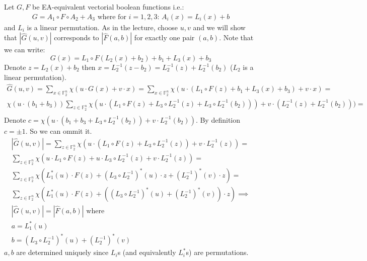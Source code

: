 \documentclass[12pt, a4paper]{article}
\begin{document}
\section{}
Let $G,F$ be EA-equivalent vectorial boolean functions i.e.:
\begin{gather}
G = A_1 \circ F \circ A_2 + A_3 \text{ where for $i=1,2,3$: } A_i(x) = L_i(x) + b
\end{gather}
and $L_i$ is a linear permutation. As in the lecture, choose $u,v$ and we will show that $|\hat{G}(u,v)|$ corresponds to $|\hat{F}(a,b)|$ for exactly one pair $(a,b)$.
Note that we can write:
\[G(x) = L_1 \circ F (L_2(x)+b_2) + b_1 + L_3(x)+b_3\]
Denote $z = L_2(x) + b_2$ then $x = L_2^{-1}(z-b_2) = L_2^{-1}(z) + L_2^{-1}(b_2)$ ($L_2$ is a linear permutation).
\begin{gather*}
\hat{G}(u,v) = \sum\limits_{x \in \mathbb{F}_2^n} \chi(u \cdot G(x) + v\cdot x) = \sum\limits_{x \in \mathbb{F}_2^n} \chi(u \cdot (L_1 \circ F(z) + b_1 + L_3(x)+b_3) + v\cdot x) = \\
\chi(u\cdot(b_1+b_3)) \sum\limits_{z \in \mathbb{F}_2^n} \chi(u \cdot (L_1 \circ F(z) + L_3 \circ L_2^{-1}(z) +L_3 \circ L_2^{-1}(b_2))) + v\cdot (L_2^{-1}(z) +L_2^{-1}(b_2))) =\\
\end{gather*}
Denote $c = \chi(u\cdot(b_1+b_3 + L_3\circ L_2^{-1}(b_2)) + v\cdot L_2^{-1}(b_2))$. By definition $c = \pm 1$. So we can ommit it.
\begin{gather*}
|\hat{G}(u,v)| = \sum\limits_{z \in \mathbb{F}_2^n} \chi(u \cdot (L_1 \circ F(z) + L_3 \circ L_2^{-1}(z)) + v\cdot L_2^{-1}(z)) =\\
\sum\limits_{z \in \mathbb{F}_2^n} \chi(u \cdot L_1 \circ F(z) + u\cdot L_3 \circ L_2^{-1}(z) + v\cdot L_2^{-1}(z)) = \\
\sum\limits_{z \in \mathbb{F}_2^n} \chi(L_1^*(u) \cdot F(z) + (L_3 \circ L_2^{-1})^*(u) \cdot z + (L_2^{-1})^*(v)\cdot z) = \\
\sum\limits_{z \in \mathbb{F}_2^n} \chi(L_1^*(u) \cdot F(z) + ((L_3 \circ L_2^{-1})^*(u) + (L_2^{-1})^*(v))\cdot z) \implies\\
|\hat{G}(u,v)| = |\hat{F}(a,b)| \text{ where }\\
a = L_1^*(u)\\
b = (L_3 \circ L_2^{-1})^*(u) + (L_2^{-1})^*(v)
\end{gather*}
$a,b$ are determined uniquely since $L_i$s (and equivalently $L_i^*$s) are permutations.
\end{document}
